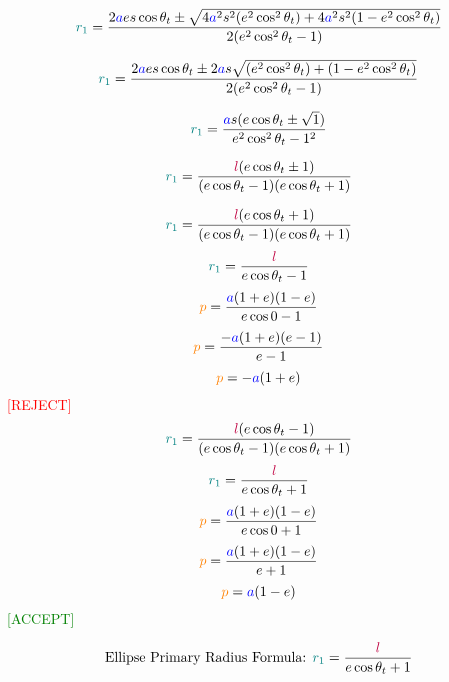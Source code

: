 $$\textcolor{teal}{r_1} = \frac{2\textcolor{blue}{a}\textcolor{black}{e}\textcolor{black}{s}\cos{\textcolor{black}{\theta_t}}\pm\sqrt{4\textcolor{blue}{a}^2\textcolor{black}{s}^2(\textcolor{black}{e}^2\cos^2{\textcolor{black}{\theta_t}}) + 4\textcolor{blue}{a}^2\textcolor{black}{s}^2(1-\textcolor{black}{e}^2\cos^2{\textcolor{black}{\theta_t}})}}{2(\textcolor{black}{e}^2\cos^2{\textcolor{black}{\theta_t}}-1)}$$

$$\textcolor{teal}{r_1} = \frac{2\textcolor{blue}{a}\textcolor{black}{e}\textcolor{black}{s}\cos{\textcolor{black}{\theta_t}} \pm2\textcolor{blue}{a}\textcolor{black}{s}\sqrt{(\textcolor{black}{e}^2\cos^2{\textcolor{black}{\theta_t}}) + (1-\textcolor{black}{e}^2\cos^2{\textcolor{black}{\theta_t}})}}{2(\textcolor{black}{e}^2\cos^2{\textcolor{black}{\theta_t}}-1)}$$

$$\textcolor{teal}{r_1} =  \frac{\textcolor{blue}{a}\textcolor{black}{s}(\textcolor{black}{e}\cos{\textcolor{black}{\theta_t}} \pm\sqrt{1})}{\textcolor{black}{e}^2\cos^2{\textcolor{black}{\theta_t}} - 1^2}$$


$$\textcolor{teal}{r_1} = \frac{\textcolor{purple}{l}(\textcolor{black}{e}\cos{\textcolor{black}{\theta_t}} \pm 1)}{(\textcolor{black}{e}\cos{\textcolor{black}{\theta_t}} - 1)(\textcolor{black}{e}\cos{\textcolor{black}{\theta_t}} + 1)}$$

\bigskip
\begin{multicols}{2}
\raggedcolumns
\noindent
$$\textcolor{teal}{r_1} = \frac{\textcolor{purple}{l}(\textcolor{black}{e}\cos{\textcolor{black}{\theta_t}} + 1)}{(\textcolor{black}{e}\cos{\textcolor{black}{\theta_t}} - 1)(\textcolor{black}{e}\cos{\textcolor{black}{\theta_t}} + 1)}$$
$$\textcolor{teal}{r_1} = \frac{\textcolor{purple}{l}}{\textcolor{black}{e}\cos{\textcolor{black}{\theta_t}} - 1}$$
$$\textcolor{orange}{p} = \frac{\textcolor{blue}{a}(1+\textcolor{black}{e})(1-\textcolor{black}{e})}{\textcolor{black}{e}\cos{0} - 1}$$
$$\textcolor{orange}{p} = \frac{-\textcolor{blue}{a}(1+\textcolor{black}{e})(\textcolor{black}{e}-1)}{\textcolor{black}{e} - 1}$$
$$\textcolor{orange}{p} = -\textcolor{blue}{a}(1+\textcolor{black}{e})$$
\centering
\textcolor{red}{[REJECT]}
\columnbreak
$$\textcolor{teal}{r_1} = \frac{\textcolor{purple}{l}(\textcolor{black}{e}\cos{\textcolor{black}{\theta_t}} - 1)}{(\textcolor{black}{e}\cos{\textcolor{black}{\theta_t}} - 1)(\textcolor{black}{e}\cos{\textcolor{black}{\theta_t}} + 1)}$$
$$\textcolor{teal}{r_1} = \frac{\textcolor{purple}{l}}{\textcolor{black}{e}\cos{\textcolor{black}{\theta_t}} + 1}$$
$$\textcolor{orange}{p} = \frac{\textcolor{blue}{a}(1+\textcolor{black}{e})(1-\textcolor{black}{e})}{\textcolor{black}{e}\cos{0} + 1}$$
$$\textcolor{orange}{p} = \frac{\textcolor{blue}{a}(1+\textcolor{black}{e})(1-\textcolor{black}{e})}{\textcolor{black}{e} + 1}$$
$$\textcolor{orange}{p} = \textcolor{blue}{a}(1-\textcolor{black}{e})$$
\centering
\textcolor{green}{[ACCEPT]}
\end{multicols}

$$\text{Ellipse Primary Radius Formula: }\textcolor{teal}{r_1} = \frac{\textcolor{purple}{l}}{\textcolor{black}{e}\cos{\textcolor{black}{\theta_t}} + 1}$$
